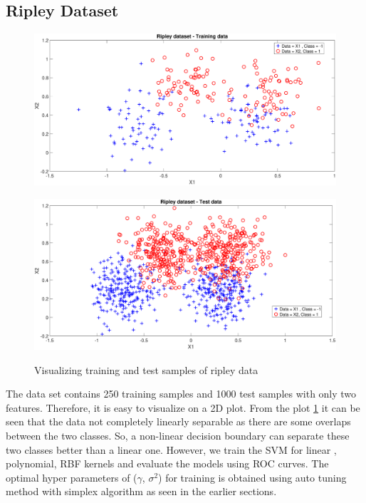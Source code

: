 \documentclass[12pt]{report}
\begin{document}
{\subsection{Ripley Dataset}
\begin{figure}
	\begin{minipage}{\linewidth}
		\centering\captionsetup[subfigure]{justification=centering}
		\includegraphics[height = 0.5\linewidth, width=0.8\linewidth]{ripley/ripley_train.eps}
		\label{fig:ripley_train}\par\vfill
		\includegraphics[height=0.5\linewidth,width=0.8\linewidth]{ripley/ripley_test.eps}
		\label{fig:ripley_test}
	\end{minipage}
	\caption{Visualizing training and test samples of ripley data}
	\label{fig:ripley}
\end{figure}
The data set contains 250 training samples and 1000 test samples with only two features. Therefore, it is easy to visualize on a 2D plot. From the plot \ref{fig:ripley} it can be seen that the data not completely linearly separable as there are some overlaps between the two classes. So, a non-linear decision boundary can separate these two classes better than a linear one.  However, we train the SVM for linear , polynomial, RBF kernels and evaluate the models using ROC curves. The optimal hyper parameters of ($\gamma$, $\sigma^2$) for training is obtained using auto tuning method with simplex algorithm as seen in the earlier sections.\\
}
\end{document}
